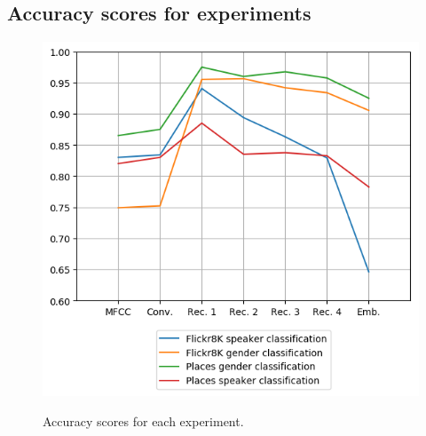 \documentclass[a4paper, oneside]{book}
\begin{document}
\begin{appendices}
\chapter{Accuracy scores for experiments}\label{accuracy-scores-for-experiments}

\begin{figure}[h!]
	\centering
	\includegraphics[scale=0.5]{images/gender-speaker-classification-accuracy.png}\\
	\caption{\label{table:gender-speaker-classification-accuracy} Accuracy scores for each experiment.  }
\end{figure}


\end{appendices}
\end{document}
